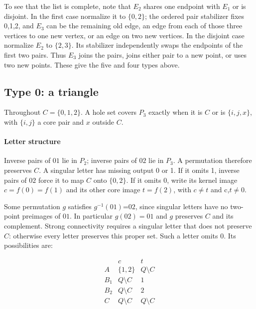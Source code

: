 \documentclass[11pt]{article}
\theoremstyle{definition}
\theoremstyle{plain}
\begin{document}
To see that the list is complete, note that \(E_2\) shares one endpoint with \(E_1\) or is
disjoint. In the first case normalize it to \(\{0,2\}\); the ordered pair
stabilizer fixes 0,1,2, and \(E_3\) can be the remaining old edge, an
edge from each of those three vertices to one new vertex, or an edge on
two new vertices. In the disjoint case normalize \(E_2\) to \(\{2,3\}\). Its
stabilizer independently swaps the endpoints of the first two pairs.
Thus \(E_3\) joins the pairs, joins either pair to a new point, or
uses two new points. These give the five and four types above.

\subsection{Type 0: a triangle}\label{triangle-early-pair-obstruction-at-codimension-three}

Throughout \(C=\{0,1,2\}\). A hole set covers \(P_{3}\)
exactly when it is \(C\) or is \(\{i,j,x\}\), with
\(\{i,j\}\) a core pair and \(x\) outside \(C\).

\paragraph{Letter structure}\label{letter-structure}

Inverse
pairs of \(01\) lie in \(P_{2}\); inverse pairs of \(02\) lie in \(P_{3}\).
A permutation therefore preserves \(C\). A singular letter has
missing output 0 or 1. If it omits 1, inverse pairs of \(02\) force it to
map \(C\) onto \(\{0,2\}\). If it omits 0, write its kernel image
\(c=f(0)=f(1)\) and its other core image \(t=f(2)\), with \(c\ne t\)
and c,\(t\ne 0\).

Some permutation \(g\) satisfies \(g^{-1}(01)\)=\(02\), since singular
letters have no two-point preimages of \(01\). In particular \(g(02)=01\)
and \(g\) preserves \(C\) and its complement. Strong connectivity
requires a singular letter that does not preserve \(C\): otherwise
every letter preserves this proper set. Such a letter omits 0. Its
possibilities are:

\[
\begin{array}{c|cc}
 &c&t\\\hline
 A&\{1,2\}&Q\setminus C\\
 B_1&Q\setminus C&1\\
 B_2&Q\setminus C&2\\
 C&Q\setminus C&Q\setminus C
\end{array}
\]
\end{document}
